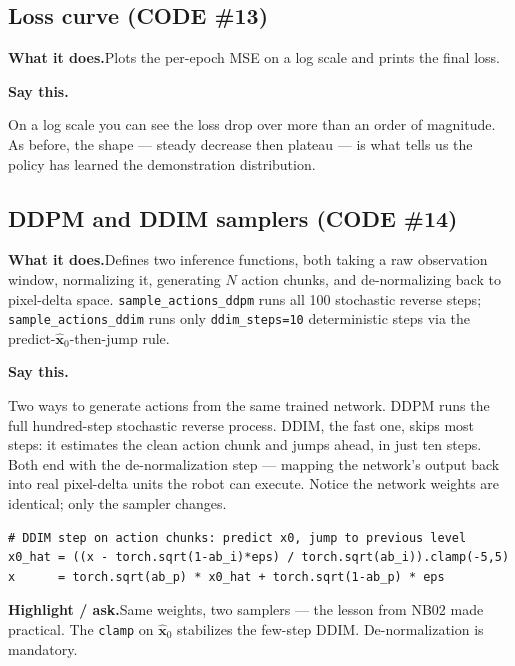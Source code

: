 \documentclass[11pt]{article}
\newenvironment{saythis}{%
  \par\smallskip\noindent
  \begin{list}{}{%
    \setlength{\leftmargin}{1.2em}%
    \setlength{\rightmargin}{0.5em}%
    \setlength{\topsep}{2pt}%
  }\item\relax
  \color{sayrule}\textbf{Say this.}\hspace{0.4em}\color{black}\itshape
}{%
  \end{list}\par\smallskip
}
\newcommand{\highlight}[1]{\par\smallskip\noindent\textcolor{hlcolor}{\textbf{Highlight / ask.}}\hspace{0.4em}#1\par\smallskip}
\newcommand{\whatdoes}[1]{\par\noindent\textbf{What it does.}\hspace{0.4em}#1\par}
\begin{document}
\subsection{Loss curve (CODE \#13)}
\whatdoes{Plots the per-epoch MSE on a log scale and prints the final loss.}
\begin{saythis}
On a log scale you can see the loss drop over more than an order of magnitude. As before, the shape ---
steady decrease then plateau --- is what tells us the policy has learned the demonstration distribution.
\end{saythis}

\subsection{DDPM and DDIM samplers (CODE \#14)}
\whatdoes{Defines two inference functions, both taking a raw observation window, normalizing it,
generating $N$ action chunks, and de-normalizing back to pixel-delta space. \texttt{sample\_actions\_ddpm}
runs all 100 stochastic reverse steps; \texttt{sample\_actions\_ddim} runs only \texttt{ddim\_steps=10}
deterministic steps via the predict-$\hat{\mathbf{x}}_0$-then-jump rule.}
\begin{saythis}
Two ways to generate actions from the same trained network. DDPM runs the full hundred-step stochastic
reverse process. DDIM, the fast one, skips most steps: it estimates the clean action chunk and jumps
ahead, in just ten steps. Both end with the de-normalization step --- mapping the network's output back
into real pixel-delta units the robot can execute. Notice the network weights are identical; only the
sampler changes.
\end{saythis}
\begin{lstlisting}
# DDIM step on action chunks: predict x0, jump to previous level
x0_hat = ((x - torch.sqrt(1-ab_i)*eps) / torch.sqrt(ab_i)).clamp(-5,5)
x      = torch.sqrt(ab_p) * x0_hat + torch.sqrt(1-ab_p) * eps
\end{lstlisting}
\highlight{Same weights, two samplers --- the lesson from NB02 made practical. The \texttt{clamp} on
$\hat{\mathbf{x}}_0$ stabilizes the few-step DDIM. De-normalization is mandatory.}
\end{document}
